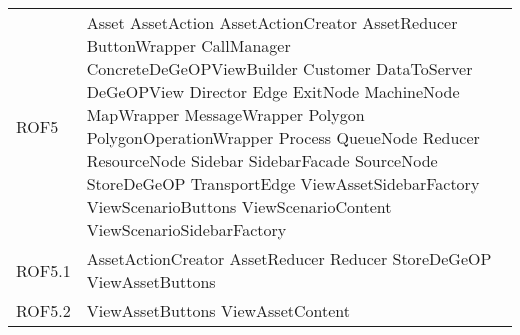 \begin{longtable}{p{2.5cm}!{\VRule[1pt]}p{5cm}}
		ROF5 & Asset \newline AssetAction \newline AssetActionCreator \newline AssetReducer \newline ButtonWrapper \newline CallManager \newline ConcreteDeGeOPViewBuilder \newline Customer \newline DataToServer \newline DeGeOPView \newline Director \newline Edge \newline ExitNode \newline MachineNode \newline MapWrapper \newline MessageWrapper \newline Polygon \newline PolygonOperationWrapper \newline Process \newline QueueNode \newline Reducer \newline ResourceNode \newline Sidebar \newline SidebarFacade \newline SourceNode \newline StoreDeGeOP \newline TransportEdge \newline ViewAssetSidebarFactory \newline ViewScenarioButtons \newline ViewScenarioContent \newline ViewScenarioSidebarFactory\\
		ROF5.1 & AssetActionCreator \newline AssetReducer \newline Reducer \newline StoreDeGeOP \newline ViewAssetButtons\\
		ROF5.2 & ViewAssetButtons \newline ViewAssetContent\\

\end{longtable}
